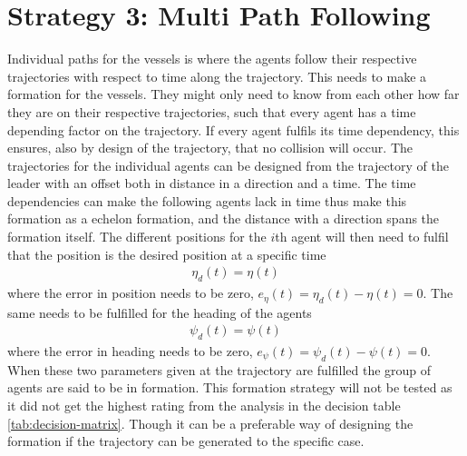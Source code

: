 \section{Strategy 3: Multi Path Following}
Individual paths for the vessels is where the agents follow their respective trajectories with respect to time along the trajectory. This needs to make a formation for the vessels. They might only need to know from each other how far they are on their respective trajectories, such that every agent has a time depending factor on the trajectory. If every agent fulfils its time dependency, this ensures, also by design of the trajectory, that no collision will occur. The trajectories for the individual agents can be designed from the trajectory of the leader with an offset both in distance in a direction and a time. The time dependencies can make the following agents lack in time thus make this formation as a echelon formation, and the distance with a direction spans the formation itself. The different positions for the $i$th agent will then need to fulfil that the position is the desired position at a specific time
\begin{align}
\eta_d(t) = \eta(t)
\end{align}
where the error in position needs to be zero, $e_\eta(t) = \eta_d(t) - \eta(t) = 0$. The same needs to be fulfilled for the heading of the agents
\begin{align}
\psi_d(t) = \psi(t)
\end{align}
where the error in heading needs to be zero, $e_\psi(t) = \psi_d(t) - \psi(t) = 0$. When these two parameters given at the trajectory are fulfilled the group of agents are said to be in formation. This formation strategy will not be tested as it did not get the highest rating from the analysis in the decision table \ref{tab:decision-matrix}. Though it can be a preferable way of designing the formation if the trajectory can be generated to the specific case.